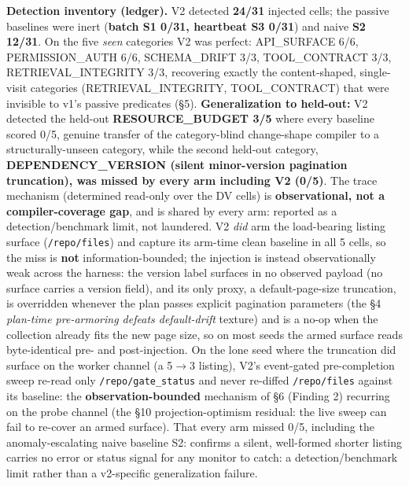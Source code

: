 \documentclass[acmsmall,screen,review,anonymous]{acmart}
\renewenvironment{leftbar}{%
  \def\FrameCommand{\hspace{2pt}{\color{lbcol}\vrule width 1.5pt}\hspace{8pt}}%
  \MakeFramed{\advance\hsize-\width \FrameRestore}\small}%
  {\endMakeFramed}
\begin{document}
\begin{leftbar}
\textbf{Detection inventory (ledger).} V2 detected \textbf{24/31} injected cells; the passive baselines were inert (\textbf{batch S1 0/31, heartbeat S3 0/31}) and naive \textbf{S2 12/31}. On the five \emph{seen} categories V2 was perfect: API\_SURFACE 6/6, PERMISSION\_AUTH 6/6, SCHEMA\_DRIFT 3/3, TOOL\_CONTRACT 3/3, RETRIEVAL\_INTEGRITY 3/3, recovering exactly the content-shaped, single-visit categories (RETRIEVAL\_INTEGRITY, TOOL\_CONTRACT) that were invisible to v1's passive predicates (\S5). \textbf{Generalization to held-out:} V2 detected the held-out \textbf{RESOURCE\_BUDGET 3/5} where every baseline scored 0/5, genuine transfer of the category-blind change-shape compiler to a structurally-unseen category, while the second held-out category, \textbf{DEPENDENCY\_VERSION (silent minor-version pagination truncation), was missed by every arm including V2 (0/5)}. The trace mechanism (determined read-only over the DV cells) is \textbf{observational, not a compiler-coverage gap}, and is shared by every arm: reported as a detection/benchmark limit, not laundered. V2 \emph{did} arm the load-bearing listing surface (\texttt{/repo/files}) and capture its arm-time clean baseline in all 5 cells, so the miss is \textbf{not} information-bounded; the injection is instead observationally weak across the harness: the version label surfaces in no observed payload (no surface carries a version field), and its only proxy, a default-page-size truncation, is overridden whenever the plan passes explicit pagination parameters (the \S4 \emph{plan-time pre-armoring defeats default-drift} texture) and is a no-op when the collection already fits the new page size, so on most seeds the armed surface reads byte-identical pre- and post-injection. On the lone seed where the truncation did surface on the worker channel (a 5$\rightarrow$3 listing), V2's event-gated pre-completion sweep re-read only \texttt{/repo/gate\_status} and never re-diffed \texttt{/repo/files} against its baseline: the \textbf{observation-bounded} mechanism of \S6 (Finding 2) recurring on the probe channel (the \S10 projection-optimism residual: the live sweep can fail to re-cover an armed surface). That every arm missed 0/5, including the anomaly-escalating naive baseline S2: confirms a silent, well-formed shorter listing carries no error or status signal for any monitor to catch: a detection/benchmark limit rather than a v2-specific generalization failure.


\end{leftbar}
\end{document}
